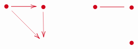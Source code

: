 \[\begin{tikzpicture}[x=0.75pt,y=0.75pt,yscale=-1,xscale=1]
\draw  [color={rgb, 255:red, 208; green, 2; blue, 27 }  ,draw opacity=1 ][line width=6] [line join = round][line cap = round] (343.11,80.11) .. controls (343.11,80.11) and (343.11,80.11) .. (343.11,80.11) ;
\draw  [color={rgb, 255:red, 208; green, 2; blue, 27 }  ,draw opacity=1 ][line width=6] [line join = round][line cap = round] (273.11,79.11) .. controls (273.11,79.11) and (273.11,79.11) .. (273.11,79.11) ;
\draw [color={rgb, 255:red, 208; green, 2; blue, 27 }  ,draw opacity=1 ]   (342.61,89.33) -- (343.57,135.33) ;
\draw [shift={(343.61,137.33)}, rotate = 268.81] [color={rgb, 255:red, 208; green, 2; blue, 27 }  ,draw opacity=1 ][line width=0.75]    (10.93,-3.29) .. controls (6.95,-1.4) and (3.31,-0.3) .. (0,0) .. controls (3.31,0.3) and (6.95,1.4) .. (10.93,3.29)   ;
\draw [color={rgb, 255:red, 208; green, 2; blue, 27 }  ,draw opacity=1 ][line width=0.75]    (282.11,79.11) -- (328.11,79.11) ;
\draw [shift={(330.11,79.11)}, rotate = 180] [color={rgb, 255:red, 208; green, 2; blue, 27 }  ,draw opacity=1 ][line width=0.75]    (10.93,-3.29) .. controls (6.95,-1.4) and (3.31,-0.3) .. (0,0) .. controls (3.31,0.3) and (6.95,1.4) .. (10.93,3.29)   ;
\draw [color={rgb, 255:red, 208; green, 2; blue, 27 }  ,draw opacity=1 ]   (283.11,87.11) -- (334.7,138.7) ;
\draw [shift={(336.11,140.11)}, rotate = 225] [color={rgb, 255:red, 208; green, 2; blue, 27 }  ,draw opacity=1 ][line width=0.75]    (10.93,-3.29) .. controls (6.95,-1.4) and (3.31,-0.3) .. (0,0) .. controls (3.31,0.3) and (6.95,1.4) .. (10.93,3.29)   ;
\draw  [color={rgb, 255:red, 208; green, 2; blue, 27 }  ,draw opacity=1 ][line width=6] [line join = round][line cap = round] (510.11,148.11) .. controls (510.11,148.11) and (510.11,148.11) .. (510.11,148.11) ;
\draw  [color={rgb, 255:red, 208; green, 2; blue, 27 }  ,draw opacity=1 ][line width=6] [line join = round][line cap = round] (510.11,81.11) .. controls (510.11,81.11) and (510.11,81.11) .. (510.11,81.11) ;
\draw  [color={rgb, 255:red, 208; green, 2; blue, 27 }  ,draw opacity=1 ][line width=6] [line join = round][line cap = round] (441.11,80.11) .. controls (441.11,80.11) and (441.11,80.11) .. (441.11,80.11) ;
\draw [color={rgb, 255:red, 208; green, 2; blue, 27 }  ,draw opacity=1 ][line width=0.75]    (450.11,80.11) -- (496.11,80.11) ;

\end{tikzpicture}\]
